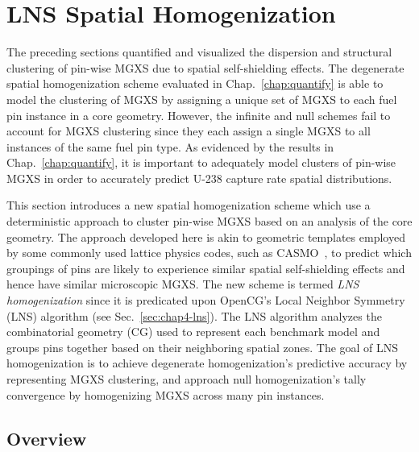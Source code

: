\section{LNS Spatial Homogenization}
\label{sec:chap9-lns-homogenize}

The preceding sections quantified and visualized the dispersion and structural clustering of pin-wise \ac{MGXS} due to spatial self-shielding effects. The degenerate spatial homogenization scheme evaluated in Chap.~\ref{chap:quantify} is able to model the clustering of \ac{MGXS} by assigning a unique set of \ac{MGXS} to each fuel pin instance in a core geometry. However, the infinite and null schemes fail to account for \ac{MGXS} clustering since they each assign a single \ac{MGXS} to all instances of the same fuel pin type. As evidenced by the results in Chap.~\ref{chap:quantify}, it is important to adequately model clusters of pin-wise \ac{MGXS} in order to accurately predict U-238 capture rate spatial distributions. 

This section introduces a new spatial homogenization scheme which use a deterministic  approach to cluster pin-wise \ac{MGXS} based on an analysis of the core geometry. The approach developed here is akin to geometric templates employed by some commonly used lattice physics codes, such as CASMO~\cite{rhodes2006casmo}, to predict which groupings of pins are likely to experience similar spatial self-shielding effects and hence have similar microscopic \ac{MGXS}. The new scheme is termed \textit{\ac{LNS} homogenization} since it is predicated upon OpenCG's Local Neighbor Symmetry (LNS) algorithm (see Sec.~\ref{sec:chap4-lns}). The \ac{LNS} algorithm analyzes the combinatorial geometry (CG) used to represent each benchmark model and groups pins together based on their neighboring spatial zones. The goal of \ac{LNS} homogenization is to achieve degenerate homogenization's predictive accuracy by representing \ac{MGXS} clustering, and approach null homogenization's tally convergence by homogenizing \ac{MGXS} across many pin instances.

\subsection{Overview}
\label{subsec:chap9-lns-overview}

